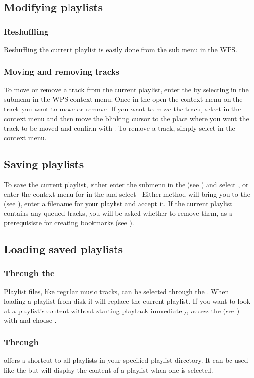 \subsection{Modifying playlists}
\subsubsection{Reshuffling}
Reshuffling the current playlist is easily done from the 
sub menu in the WPS.

\subsubsection{Moving and removing tracks}
To move or remove a track from the current playlist, enter the
 by selecting  in the
 submenu in the WPS context menu.
Once in the  open the context menu on the track you
want to move or remove. If you want to move the track, select  in
the context menu and then move the blinking cursor to the place where you want
the track to be moved and confirm with \ActionStdOk. To remove a track, simply
select  in the context menu.

\subsection{Saving playlists}
To save the current playlist, either enter the  submenu
in the  (see ) and
select , or enter the context menu for
 in the  and select
.
Either method will bring you to the  (see
), enter a filename for your playlist and
accept it. If the current playlist contains any queued tracks, you will be
asked whether to remove them, as a prerequisiste for creating bookmarks
(see ).

\subsection{Loading saved playlists}
\subsubsection{Through the }
Playlist files, like regular music tracks, can be selected through the
. When loading a playlist from disk it will replace
the current playlist. If you want to look at a playlist's
content without starting playback immediately, access the  (see
) with \ActionStdContext{} and choose .

\subsubsection{Through }
 offers a shortcut to all playlists in your
\daps{} specified playlist directory.
It can be used like the  but will display
the content of a playlist when one is selected.

